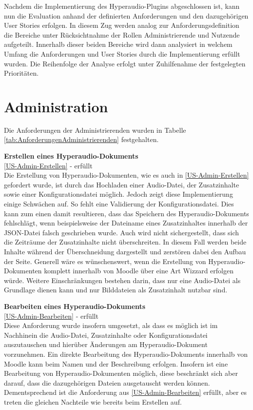 \label{cap:evaluation}
Nachdem die Implementierung des Hyperaudio-Plugins abgeschlossen ist, kann nun die Evaluation anhand der definierten Anforderungen und den dazugehörigen User Stories erfolgen. In diesem Zug werden analog zur Anforderungsdefinition die Bereiche unter Rücksichtnahme der Rollen Administrierende und Nutzende aufgeteilt. Innerhalb dieser beiden Bereiche wird dann analysiert in welchem Umfang die Anforderungen und User Stories durch die Implementierung erfüllt wurden. Die Reihenfolge der Analyse erfolgt unter Zuhilfenahme der festgelegten Prioritäten.

\section{Administration}
\label{sec:eval_administration}
Die Anforderungen der Administrierenden wurden in Tabelle \ref{tab:AnforderungenAdministrierenden} festgehalten.


\textbf{Erstellen eines Hyperaudio-Dokuments}\\
\ref{US-Admin-Erstellen} - erfüllt\\
Die Erstellung von Hyperaudio-Dokumenten, wie es auch in \ref{US-Admin-Erstellen} gefordert wurde, ist durch das Hochladen einer Audio-Datei, der Zusatzinhalte sowie einer Konfigurationsdatei möglich. Jedoch zeigt diese Implementierung einige Schwächen auf. So fehlt eine Validierung der Konfigurationsdatei. Dies kann zum einen damit resultieren, dass das Speichern des Hyperaudio-Dokuments fehlschlägt, wenn beispielsweise der Dateiname eines Zusatzinhaltes innerhalb der JSON-Datei falsch geschrieben wurde. Auch wird nicht sichergestellt, dass sich die Zeiträume der Zusatzinhalte nicht überschreiten. In diesem Fall werden beide Inhalte während der Überschneidung dargestellt und zerstören dabei den Aufbau der Seite. Generell wäre es wünschenswert, wenn die Erstellung von Hyperaudio-Dokumenten komplett innerhalb von Moodle über eine Art Wizzard erfolgen würde. Weitere Einschränkungen bestehen darin, dass nur eine Audio-Datei als Grundlage dienen kann und nur Bilddateien als Zusatzinhalt nutzbar sind.

\textbf{Bearbeiten eines Hyperaudio-Dokuments}\\
\ref{US-Admin-Bearbeiten} - erfüllt\\
Diese Anforderung wurde insofern umgesetzt, als dass es möglich ist im Nachhinein die Audio-Datei, Zusatzinhalte oder Konfigurationsdatei auszutauschen und hierüber Änderungen am Hyperaudio-Dokument vorzunehmen. Ein direkte Bearbeitung des Hyperaudio-Dokuments innerhalb von Moodle kann beim Namen und der Beschreibung erfolgen. Insofern ist eine Bearbeitung von Hyperaudio-Dokumenten möglich, diese beschränkt sich aber darauf, dass die dazugehörigen Dateien ausgetauscht werden können. Dementsprechend ist die Anforderung aus \ref{US-Admin-Bearbeiten} erfüllt, aber es treten die gleichen Nachteile wie bereits beim Erstellen auf.

